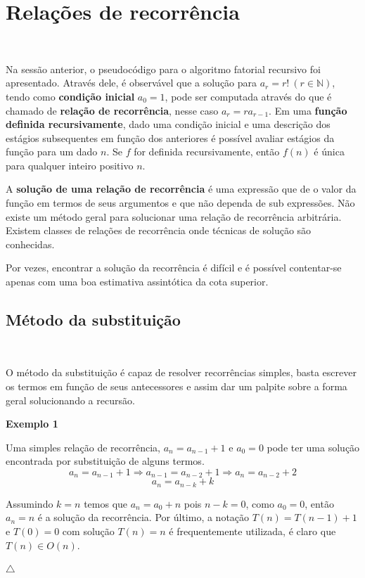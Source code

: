 \section{Relações de recorrência}
\

Na sessão anterior, o pseudocódigo para o algoritmo fatorial recursivo foi apresentado. Através dele, é observável que a solução para $a_r = r! \ (r \in \mathbb{N})$, tendo como \textbf{condição inicial} $a_0 = 1$, pode ser computada através do que é chamado de \textbf{relação de recorrência}, nesse caso $a_r = ra_{r-1}$. Em uma \textbf{função definida recursivamente}, dado uma condição inicial e uma descrição dos estágios subsequentes em função dos anteriores é possível avaliar estágios da função para um dado $n$. Se $f$ for definida recursivamente, então $f(n)$ é única para qualquer inteiro positivo $n$.

A \textbf{solução de uma relação de recorrência} é uma expressão que de o valor da função em termos de seus argumentos e que não dependa de sub expressões. Não existe um método geral para solucionar uma relação de recorrência arbitrária. Existem classes de relações de recorrência onde técnicas de solução são conhecidas.

Por vezes, encontrar a solução da recorrência é difícil e é possível contentar-se apenas com uma boa estimativa assintótica da cota superior.

\subsection{Método da substituição}
\

O método da substituição é capaz de resolver recorrências simples, basta escrever os termos em função de seus antecessores e assim dar um palpite sobre a forma geral solucionando a recursão.

\textbf{Exemplo 1}

Uma simples relação de recorrência, $a_n = a_{n-1} + 1$ e $a_0=0$ pode ter uma solução encontrada por substituição de alguns termos.
\[a_n = a_{n-1} + 1 \Rightarrow a_{n-1} = a_{n-2} + 1 \Rightarrow a_n = a_{n-2} + 2\]
\[a_n = a_{n-k} + k\]

Assumindo $k=n$ temos que $a_n=a_0 + n$ pois $n-k = 0$, como $a_0=0$, então $a_n=n$ é a solução da recorrência. Por último, a notação $T(n)=T(n-1)+1$ e $T(0)=0$ com solução $T(n) = n$ é frequentemente utilizada, é claro que $T(n) \in O(n)$.

{\raggedleft $\bigtriangleup$ \par}

